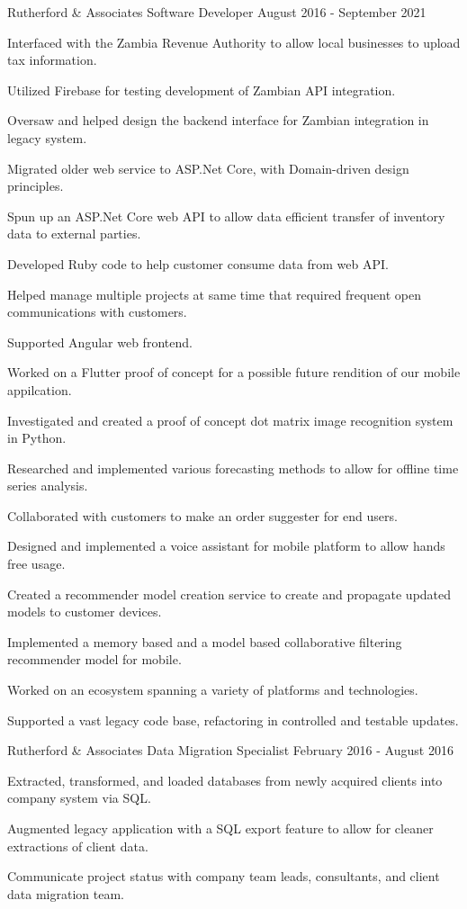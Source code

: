 \documentclass{marvinkassabian_resume}
\begin{document}
		\subsectionpositiondate
				{Rutherford \& Associates}
				{Software Developer}
				{August 2016 - September 2021}
		\resumesublistbegin
			\item Interfaced with the Zambia Revenue Authority to allow local businesses to upload tax information.
			\item Utilized Firebase for testing development of Zambian API integration.
			\item Oversaw and helped design the backend interface for Zambian integration in legacy system.
			\item Migrated older web service to ASP.Net Core, with Domain-driven design principles.
			\item Spun up an ASP.Net Core web API to allow data efficient transfer of inventory data to external parties.
			\item Developed Ruby code to help customer consume data from web API.
			\item Helped manage multiple projects at same time that required frequent open communications with customers.
			\item Supported Angular web frontend.
			\item Worked on a Flutter proof of concept for a possible future rendition of our mobile appilcation.
			\item Investigated and created a proof of concept dot matrix image recognition system in Python.
			\item Researched and implemented various forecasting methods to allow for offline time series analysis.
			\item Collaborated with customers to make an order suggester for end users.
			\item Designed and implemented a voice assistant for mobile platform to allow hands free usage. 
			\item Created a recommender model creation service to create and propagate updated models to customer devices.
			\item Implemented a memory based and a model based collaborative filtering recommender model for mobile.
			\item Worked on an ecosystem spanning a variety of platforms and technologies.
			\item Supported a vast legacy code base, refactoring in controlled and testable updates.
		\resumesublistend

		\subsectionpositiondate
				{Rutherford \& Associates}
				{Data Migration Specialist}
				{February 2016 - August 2016}
		\resumesublistbegin
			\item Extracted, transformed, and loaded databases from newly acquired clients into company system via SQL.
			\item Augmented legacy \cpp application with a SQL export feature to allow for cleaner extractions of client data.
			\item Communicate project status with company team leads, consultants, and client data migration team.
		\resumesublistend
\end{document}
